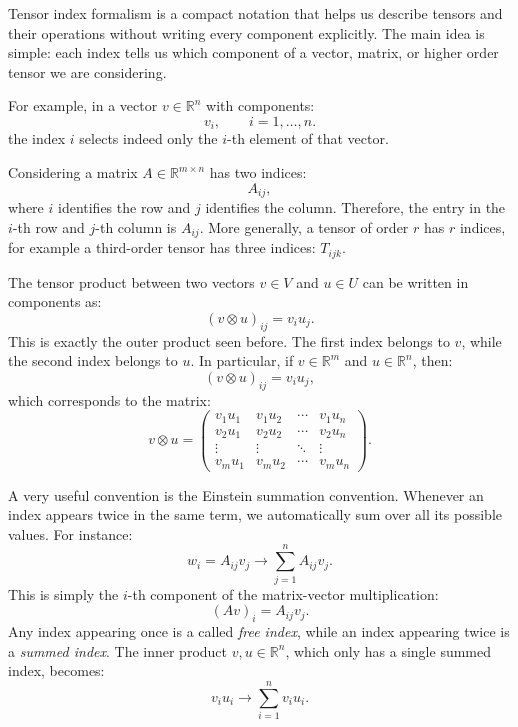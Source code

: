 \documentclass[12pt,a4paper]{article}
\begin{document}
Tensor index formalism is a compact notation that helps us describe tensors and their operations without writing every component explicitly. The main idea is simple: each index tells us which component of a vector, matrix, or higher order tensor we are considering.

For example, in a vector $v\in\mathbb{R}^n$ with components:
\begin{equation*}
	v_i, \qquad i=1,\ldots,n.
\end{equation*}
the index $i$ selects indeed only the $i$-th element of that vector.

Considering a matrix $A\in\mathbb{R}^{m\times n}$ has two indices:
\begin{equation*}
	A_{ij},
\end{equation*}
where $i$ identifies the row and $j$ identifies the column. Therefore, the entry in the $i$-th row and $j$-th column is $A_{ij}$.
More generally, a tensor of order $r$ has $r$ indices, for example a third-order tensor has three indices: $T_{ijk}$.

The tensor product between two vectors $v\in V$ and $u\in U$ can be written in components as:
\begin{equation*}
	(v\otimes u)_{ij} = v_i u_j.
\end{equation*}
This is exactly the outer product seen before. The first index belongs to $v$, while the second index belongs to $u$.
In particular, if $v\in\mathbb{R}^m$ and $u\in\mathbb{R}^n$, then:
\begin{equation*}
	(v\otimes u)_{ij} = v_i u_j,
\end{equation*}
which corresponds to the matrix:
\begin{equation*}
	v\otimes u =
	\begin{pmatrix}
		v_1u_1 & v_1u_2 & \cdots & v_1u_n\\
		v_2u_1 & v_2u_2 & \cdots & v_2u_n\\
		\vdots & \vdots & \ddots & \vdots\\
		v_mu_1 & v_mu_2 & \cdots & v_mu_n
	\end{pmatrix}.
\end{equation*}

A very useful convention is the Einstein summation convention. Whenever an index appears twice in the same term, we automatically sum over all its possible values. For instance:
\begin{equation*}
	w_i = A_{ij}v_j \rightarrow \sum_{j=1}^{n} A_{ij}v_j.
\end{equation*}
This is simply the $i$-th component of the matrix-vector multiplication:
\begin{equation*}
	(Av)_i = A_{ij}v_j.
\end{equation*}
Any index appearing once is a called \textit{free index}, while an index appearing twice is a \emph{summed index}.
The inner product $v,u\in\mathbb{R}^n$, which only has a single summed index, becomes:
\begin{equation*}
	v_i u_i \rightarrow \sum_{i=1}^{n} v_i u_i.
\end{equation*}
\end{document}

